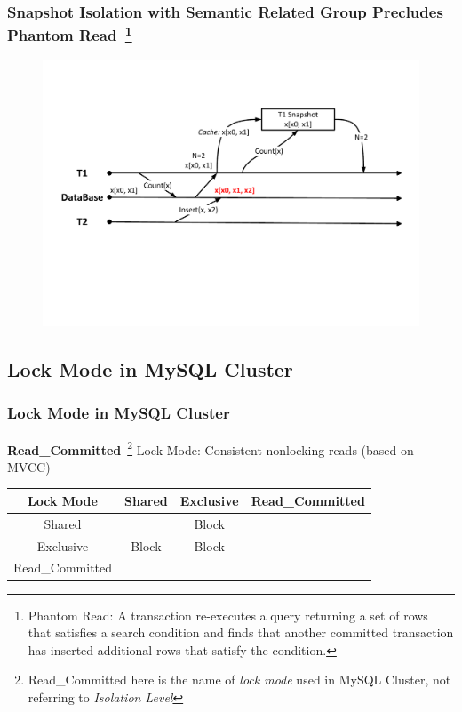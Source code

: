 \documentclass{beamer}
\begin{document}
\begin{frame}
	\frametitle{Snapshot Isolation with Semantic Related Group Precludes \textbf{Phantom Read}~\footnote{Phantom Read: A transaction re-executes a query returning a set of rows that satisfies a search condition and finds that another committed transaction has inserted additional rows that satisfy the condition.}}
\begin{figure}[!h]
	\centering
	\includegraphics[width=\linewidth]{figs/snapphantom.pdf}
\end{figure}
\end{frame}

\subsection{Lock Mode in MySQL Cluster}
\begin{frame}
	\frametitle{Lock Mode in MySQL Cluster}
	\textbf{Read\_Committed}~\footnote{Read\_Committed here is the name of \textit{lock mode} used in MySQL Cluster, not referring to \textit{Isolation Level}} Lock Mode: Consistent nonlocking reads (based on MVCC)
\begin{table}[h]
	\centering
	\begin{tabular}{|c|c|c|c|}
		\hline
		\textbf{Lock Mode} & \textbf{Shared} & \textbf{Exclusive} & \textbf{Read\_Committed} \\ \hline
		Shared             & \checkmark               & Block              & \checkmark                        \\ \hline
		Exclusive          & Block           & Block              & \checkmark                        \\ \hline
		Read\_Committed    & \checkmark               &            \checkmark        & \checkmark                        \\ \hline
	\end{tabular}
\end{table}
\end{frame}
\end{document}
